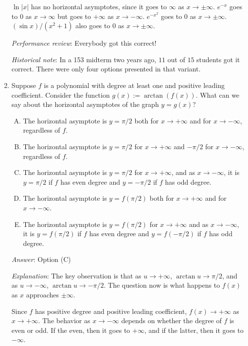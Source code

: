 \documentclass[10pt]{amsart}
\begin{document}
\begin{enumerate}
  $\ln|x|$ has no horizontal asymptotes, since it goes to $\infty$ as
  $x \to \pm \infty$. $e^{-x}$ goes to $0$ as $x \to \infty$ but goes
  to $+\infty$ as $x \to -\infty$. $e^{-x^2}$ goes to $0$ as $x \to \pm
  \infty$. $(\sin x)/(x^2 + 1)$ also goes to $0$ as $x \to \pm
  \infty$.

  {\em Performance review}: Everybody got this correct!

  {\em Historical note}: In a 153 midterm two years ago, $11$ out of
  $15$ students got it correct. There were only four options presented
  in that variant.

\item Suppose $f$ is a polynomial with degree at least one and
  positive leading coefficient. Consider the function $g(x) :=
  \arctan(f(x))$. What can we say about the horizontal asymptotes of
  the graph $y = g(x)$?

  \begin{enumerate}[(A)]
  \item The horizontal asymptote is $y = \pi/2$ both for $x \to +\infty$
    and for $x \to -\infty$, regardless of $f$.
  \item The horizontal asymptote is $y = \pi/2$ for $x \to +\infty$ and
    $-\pi/2$ for $x \to -\infty$, regardless of $f$.
  \item The horizontal asymptote is $y = \pi/2$ for $x \to +\infty$,
    and as $x \to -\infty$, it is $y = \pi/2$ if $f$ has even degree
    and $y = -\pi/2$ if $f$ has odd degree.
  \item The horizontal asymptote is $y = f(\pi/2)$ both for $x \to
    +\infty$ and for $x \to -\infty$.
  \item The horizontal asymptote is $y = f(\pi/2)$ for $x \to +\infty$
    and as $x \to -\infty$, it is $y = f(\pi/2)$ if $f$ has even
    degree and $y = f(-\pi/2)$ if $f$ has odd degree.
  \end{enumerate}

  {\em Answer}: Option (C)

  {\em Explanation}: The key observation is that as $u \to +\infty$,
  $\arctan u \to \pi/2$, and as $u \to -\infty$, $\arctan u \to
  -\pi/2$. The question now is what happens to $f(x)$ as $x$
  approaches $\pm \infty$.

  Since $f$ has positive degree and positive leading coefficient,
  $f(x) \to +\infty$ as $x \to +\infty$. The behavior as $x \to
  -\infty$ depends on whether the degree of $f$ is even or odd. If the
  even, then it goes to $+\infty$, and if the latter, then it goes to
  $-\infty$.


\end{enumerate}
\end{document}
